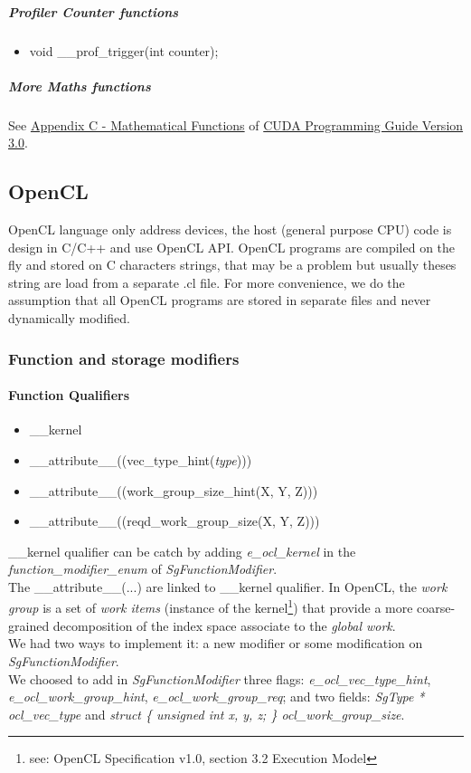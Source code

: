 					\subparagraph{Profiler Counter functions}

\begin{itemize}
	\item void \_\_prof\_trigger(int counter);
\end{itemize}

					\subparagraph{More Maths functions}

See \underline{Appendix C - Mathematical Functions} of \underline{CUDA Programming Guide Version 3.0}.
		
		\subsection{OpenCL}
		
OpenCL language only address devices, the host (general purpose CPU) code is design in C/C++ and use OpenCL API. OpenCL programs are compiled on the
fly and stored on C characters strings, that may be a problem but usually theses string are load from a separate .cl file. For more convenience,
we do the assumption that all OpenCL programs are stored in separate files and never dynamically modified.
		
			\subsubsection{Function and storage modifiers}

				\paragraph{Function Qualifiers}

\begin{itemize}
	\item \_\_kernel
	\item \_\_attribute\_\_((vec\_type\_hint(\emph{type})))
	\item \_\_attribute\_\_((work\_group\_size\_hint(X, Y, Z)))
	\item \_\_attribute\_\_((reqd\_work\_group\_size(X, Y, Z)))
\end{itemize}

\_\_kernel qualifier can be catch by adding \emph{e\_ocl\_kernel} in the \emph{function\_modifier\_enum} of \emph{SgFunctionModifier}.\\

The \_\_attribute\_\_(...) are linked to \_\_kernel qualifier. In OpenCL, the  \emph{work group} is a set of  \emph{work items} (instance of
the kernel\footnote{see: OpenCL Specification v1.0, section 3.2 Execution Model}) that provide a more coarse-grained decomposition of the
index space associate to the \emph{global work}.\\
We had two ways to implement it: a new modifier or some modification on \emph{SgFunctionModifier}.\\
We choosed to add in \emph{SgFunctionModifier} three flags: \emph{e\_ocl\_vec\_type\_hint}, \emph{e\_ocl\_work\_group\_hint}, 
\emph{e\_ocl\_work\_group\_req}; and two fields: \emph{SgType * ocl\_vec\_type} and \emph{struct \{ unsigned int x, y, z; \} ocl\_work\_group\_size}.

